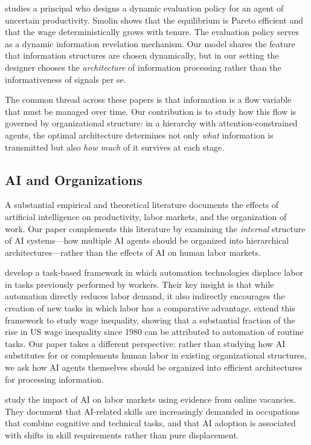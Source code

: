 \citet{smolin2021dynamic} studies a principal who designs a dynamic evaluation policy for an agent of uncertain productivity. Smolin shows that the equilibrium is Pareto efficient and that the wage deterministically grows with tenure. The evaluation policy serves as a dynamic information revelation mechanism. Our model shares the feature that information structures are chosen dynamically, but in our setting the designer chooses the \emph{architecture} of information processing rather than the informativeness of signals per se.

The common thread across these papers is that information is a flow variable that must be managed over time. Our contribution is to study how this flow is governed by organizational structure: in a hierarchy with attention-constrained agents, the optimal architecture determines not only \emph{what} information is transmitted but also \emph{how much} of it survives at each stage.

\subsection{AI and Organizations}

A substantial empirical and theoretical literature documents the effects of artificial intelligence on productivity, labor markets, and the organization of work. Our paper complements this literature by examining the \emph{internal} structure of AI systems---how multiple AI agents should be organized into hierarchical architectures---rather than the effects of AI on human labor markets.

\citet{acemoglu2018race} develop a task-based framework in which automation technologies displace labor in tasks previously performed by workers. Their key insight is that while automation directly reduces labor demand, it also indirectly encourages the creation of new tasks in which labor has a comparative advantage. \citet{acemoglu2022tasks} extend this framework to study wage inequality, showing that a substantial fraction of the rise in US wage inequality since 1980 can be attributed to automation of routine tasks. Our paper takes a different perspective: rather than studying how AI substitutes for or complements human labor in existing organizational structures, we ask how AI agents themselves should be organized into efficient architectures for processing information.

\citet{acemoglu2022ai} study the impact of AI on labor markets using evidence from online vacancies. They document that AI-related skills are increasingly demanded in occupations that combine cognitive and technical tasks, and that AI adoption is associated with shifts in skill requirements rather than pure displacement.

